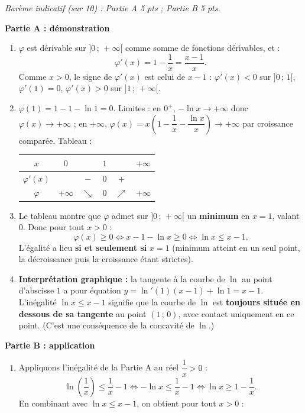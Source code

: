 \documentclass[11pt]{article}
\begin{document}
\begin{corrige}
\emph{Barème indicatif (sur 10) : Partie A 5 pts ; Partie B 5 pts.}

\textbf{Partie A : démonstration}
\begin{enumerate}
\item $\varphi$ est dérivable sur $]0\,;\,+\infty[$ comme somme de fonctions dérivables, et :
\[ \varphi'(x)=1-\dfrac{1}{x}=\dfrac{x-1}{x}. \]
Comme $x>0$, le signe de $\varphi'(x)$ est celui de $x-1$ : $\varphi'(x)<0$ sur $]0\,;\,1[$, $\varphi'(1)=0$, $\varphi'(x)>0$ sur $]1\,;\,+\infty[$.
\item $\varphi(1)=1-1-\ln 1=0$. Limites : en $0^+$, $-\ln x\to+\infty$ donc $\varphi(x)\to+\infty$ ; en $+\infty$, $\varphi(x)=x\left(1-\dfrac{1}{x}-\dfrac{\ln x}{x}\right)\to+\infty$ par croissance comparée. Tableau :
\begin{center}
\begin{tabular}{|c|ccccc|}\hline
$x$ & $0$ & & $1$ & & $+\infty$ \\ \hline
$\varphi'(x)$ & & $-$ & $0$ & $+$ & \\ \hline
$\varphi$ & $+\infty$ & $\searrow$ & $0$ & $\nearrow$ & $+\infty$ \\ \hline
\end{tabular}
\end{center}
\item Le tableau montre que $\varphi$ admet sur $]0\,;\,+\infty[$ un \textbf{minimum} en $x=1$, valant $0$. Donc pour tout $x>0$ :
\[ \varphi(x)\geq 0 \iff x-1-\ln x\geq 0 \iff \ln x\leq x-1. \]
L'égalité a lieu \textbf{si et seulement si} $x=1$ (minimum atteint en un seul point, la décroissance puis la croissance étant strictes).
\item \textbf{Interprétation graphique :} la tangente à la courbe de $\ln$ au point d'abscisse $1$ a pour équation $y=\ln'(1)(x-1)+\ln 1=x-1$. L'inégalité $\ln x\leq x-1$ signifie que la courbe de $\ln$ est \textbf{toujours située en dessous de sa tangente} au point $(1\,;\,0)$, avec contact uniquement en ce point. (C'est une conséquence de la concavité de $\ln$.)
\end{enumerate}
\textbf{Partie B : application}
\begin{enumerate}
\item Appliquons l'inégalité de la Partie A au réel $\dfrac{1}{x}>0$ :
\[ \ln\left(\dfrac{1}{x}\right)\leq \dfrac{1}{x}-1 \iff -\ln x\leq \dfrac{1}{x}-1 \iff \ln x\geq 1-\dfrac{1}{x}. \]
En combinant avec $\ln x\leq x-1$, on obtient pour tout $x>0$ :

\end{enumerate}
\end{corrige}
\end{document}
